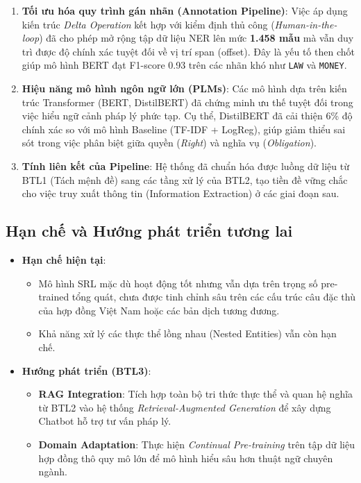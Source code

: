 \begin{enumerate}
    \item \textbf{Tối ưu hóa quy trình gán nhãn (Annotation Pipeline)}: 
    Việc áp dụng kiến trúc \textit{Delta Operation} kết hợp với kiểm định thủ công (\textit{Human-in-the-loop}) đã cho phép mở rộng tập dữ liệu NER lên mức \textbf{1.458 mẫu} mà vẫn duy trì được độ chính xác tuyệt đối về vị trí span (offset). Đây là yếu tố then chốt giúp mô hình BERT đạt F1-score 0.93 trên các nhãn khó như \texttt{LAW} và \texttt{MONEY}.

    \item \textbf{Hiệu năng mô hình ngôn ngữ lớn (PLMs)}: 
    Các mô hình dựa trên kiến trúc Transformer (BERT, DistilBERT) đã chứng minh ưu thế tuyệt đối trong việc hiểu ngữ cảnh pháp lý phức tạp. Cụ thể, DistilBERT đã cải thiện 6\% độ chính xác so với mô hình Baseline (TF-IDF + LogReg), giúp giảm thiểu sai sót trong việc phân biệt giữa quyền (\textit{Right}) và nghĩa vụ (\textit{Obligation}).

    \item \textbf{Tính liên kết của Pipeline}: 
    Hệ thống đã chuẩn hóa được luồng dữ liệu từ BTL1 (Tách mệnh đề) sang các tầng xử lý của BTL2, tạo tiền đề vững chắc cho việc truy xuất thông tin (Information Extraction) ở các giai đoạn sau.
\end{enumerate}

\subsection{Hạn chế và Hướng phát triển tương lai}

\begin{itemize}
    \item \textbf{Hạn chế hiện tại}: 
    \begin{itemize}
        \item Mô hình SRL mặc dù hoạt động tốt nhưng vẫn dựa trên trọng số pre-trained tổng quát, chưa được tinh chỉnh sâu trên các cấu trúc câu đặc thù của hợp đồng Việt Nam hoặc các bản dịch tương đương.
        \item Khả năng xử lý các thực thể lồng nhau (Nested Entities) vẫn còn hạn chế.
    \end{itemize}
    
    \item \textbf{Hướng phát triển (BTL3)}:
    \begin{itemize}
        \item \textbf{RAG Integration}: Tích hợp toàn bộ tri thức thực thể và quan hệ nghĩa từ BTL2 vào hệ thống \textit{Retrieval-Augmented Generation} để xây dựng Chatbot hỗ trợ tư vấn pháp lý.
        \item \textbf{Domain Adaptation}: Thực hiện \textit{Continual Pre-training} trên tập dữ liệu hợp đồng thô quy mô lớn để mô hình hiểu sâu hơn thuật ngữ chuyên ngành.
    \end{itemize}
\end{itemize}
